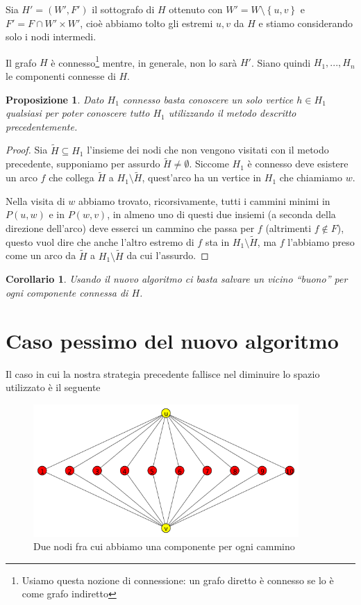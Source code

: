 \documentclass[a4paper,10pt]{amsbook}
\newcounter{counter1}
\theoremstyle{plain}
\newtheorem{mypro}[counter1]{Proposizione}
\newtheorem{mycor}[counter1]{Corollario}
\theoremstyle{definition}
\theoremstyle{remark}
\newcommand{\set}[1]{\left\{#1\right\}}
\begin{document}
Sia $H' = (W',F')$ il sottografo di $H$ ottenuto con $W' = W \setminus
\set{u,v}$ e $F' = F \cap W' \times W'$, cio\`e abbiamo tolto gli
estremi $u,v$ da $H$ e stiamo considerando solo i nodi intermedi.

Il grafo $H$ \`e connesso\footnote{Usiamo questa nozione di
  connessione: un grafo diretto \`e connesso se lo \`e come grafo
  indiretto} mentre, in generale, non lo sar\`a $H'$. Siano quindi
$H_1, ..., H_n$ le componenti connesse di $H$.

\begin{mypro}
  Dato $H_1$ connesso basta conoscere un solo vertice $h \in H_1$
  qualsiasi per poter conoscere tutto $H_1$ utilizzando il metodo
  descritto precedentemente.
\end{mypro}
\begin{proof}
  Sia $\tilde H \subseteq H_1$ l'insieme dei nodi che non vengono
  visitati con il metodo precedente, supponiamo per assurdo $\tilde H
  \neq \emptyset$. Siccome $H_1$ \`e connesso deve esistere un arco
  $f$ che collega $\tilde H$ a $H_1 \setminus \tilde H$, quest'arco ha
  un vertice in $H_1$ che chiamiamo $w$.

  Nella visita di $w$ abbiamo trovato, ricorsivamente, tutti i cammini
  minimi in $P(u,w)$ e in $P(w,v)$, in almeno uno di questi due
  insiemi (a seconda della direzione dell'arco) deve esserci un
  cammino che passa per $f$ (altrimenti $f\not\in F$), questo vuol
  dire che anche l'altro estremo di $f$ sta in $H_1 \setminus \tilde
  H$, ma $f$ l'abbiamo preso come un arco da $\tilde H$ a $H_1
  \setminus \tilde H$ da cui l'assurdo.
\end{proof}
\begin{mycor}
  Usando il nuovo algoritmo ci basta salvare un vicino ``buono'' per
  ogni componente connessa di $H$.
\end{mycor}

\section{Caso pessimo del nuovo algoritmo}
\label{sec:casopessimo}

Il caso in cui la nostra strategia precedente fallisce nel
diminuire lo spazio utilizzato \`e il seguente

\begin{figure}[H]
  \centering
  \includegraphics[width=0.9\textwidth]{diamante}
  \caption{Due nodi fra cui abbiamo una componente per ogni cammino}
  \label{fig:diamante}
\end{figure}
\end{document}
